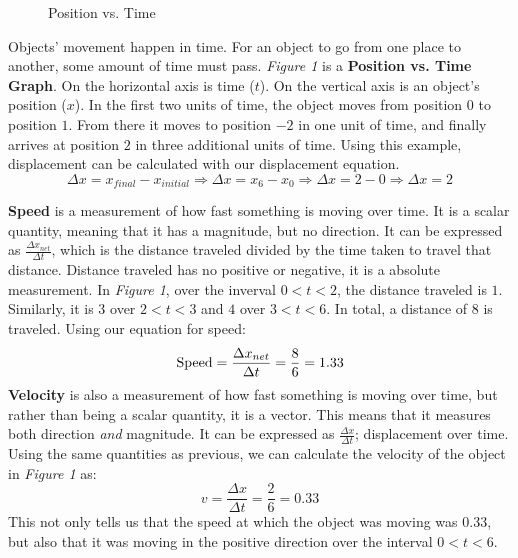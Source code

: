 \documentclass{article}
\begin{document}
\begin{wrapfigure}{R}{8cm}
  \caption{Position vs. Time}
\end{wrapfigure}

Objects' movement happen in time. For an object to go from one place to another, some amount
of time must pass. \textit{Figure 1} is a \textbf{Position vs. Time Graph}. On the
horizontal axis is time ($t$). On the vertical axis is an object's position ($x$). In the 
first two units of time, the object moves from position $0$ to position $1$. From there it
moves to position $-2$ in one unit of time, and finally arrives at position $2$ in three 
additional units of time. Using this example, displacement can be calculated with our displacement
equation. 
\begin{equation*}
  \Delta x = x_{final} - x_{initial} \Rightarrow \Delta x = x_{6} - x_{0} \Rightarrow \Delta x = 2 - 0 \Rightarrow \Delta x = 2
\end{equation*}

\textbf{Speed} is a measurement of how fast something is moving over time. It is a scalar
quantity, meaning that it has a magnitude, but no direction. It can be expressed
as $\frac{\Delta x_{net}}{\Delta t}$, which is the distance traveled divided by the time taken
to travel that distance. Distance traveled has no positive or negative, it is a absolute measurement.
In \textit{Figure 1}, over the inverval $0<t<2$, the distance traveled is $1$. Similarly, it
is $3$ over $2<t<3$ and $4$ over $3<t<6$. In total, a distance of $8$ is traveled. Using our
equation for speed:
\begin{equation*}
  \textup{Speed} = \frac{\Delta x_{net}}{\Delta t} = \frac{8}{6} = 1.33
\end{equation*}
\textbf{Velocity} is also a measurement of how fast something is moving over time, but rather
than being a scalar quantity, it is a vector. This means that it measures both direction \textit{and}
magnitude. It can be expressed as $\frac{\Delta x}{\Delta t}$; displacement over time. Using
the same quantities as previous, we can calculate the velocity of the object in \textit{Figure 1}
as:
\begin{equation*}
  v = \frac{\Delta x}{\Delta t} = \frac{2}{6} = 0.33
\end{equation*}
This not only tells us that the speed at which the object was moving was 0.33, but also that 
it was moving in the positive direction over the interval $0<t<6$.
\end{document}
